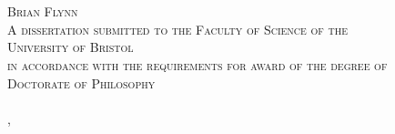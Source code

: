 \begin{titlepage}
{    }\\[0.4cm] %
    \HRule \\[1.5cm]
    
    
    \vspace{0.2cm}
    \textsc{\LARGE Brian Flynn}\\[1.5cm]
    
    \vspace{2.2cm}
    \textsc{
        \normalsize A dissertation submitted to the Faculty of Science of the \\ 
        \vspace{0.1cm}
        \Large University of Bristol \\    
        \vspace{0.1cm}
        \normalsize in accordance with the requirements for award of the degree of \\
        \vspace{0.1cm}
        \LARGE Doctorate of Philosophy \\
        \vspace{0.1cm}
    }\\[1.5cm]
    
    
    {\Large \monthname, \the\year}\\[1cm] %
    
    
    
    \end{titlepage}
